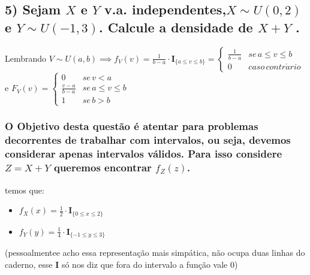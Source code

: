 \documentclass[portuguese]{article}
\begin{document}
\subsection*{\textmd{5) Sejam $X$ e $Y$ v.a. independentes,$X\sim U(0,2)$ e
$Y\sim U(-1,3)$. Calcule a densidade de $X+Y$ . }}

Lembrando $V\sim U(a,b)\implies f_{V}(v)=\frac{1}{b-a}\cdot\mathbf{I}_{\{a\leq v\leq b\}}=\begin{cases}
\frac{1}{b-a} & se\, a\leq v\leq b\\
0 & caso\, contr\acute{a}rio
\end{cases}$ e $F_{V}(v)=\begin{cases}
0 & se\, v<a\\
\frac{v-a}{b-a} & se\, a\leq v\leq b\\
1 & se\, b>b
\end{cases}$


\subsubsection*{\textmd{O Objetivo desta questão é atentar para problemas decorrentes
de trabalhar com intervalos, ou seja, devemos considerar apenas intervalos
válidos. Para isso considere $Z=X+Y$ queremos encontrar $f_{Z}(z)$. }}

temos que:
\begin{itemize}
\item $f_{X}(x)=\frac{1}{2}\cdot\mathbf{I}_{\{0\leq x\leq2\}}$
\item $f_{Y}(y)=\frac{1}{4}\cdot\mathbf{I}_{\{-1\leq y\leq3\}}$
\end{itemize}
(pessoalmentee acho essa representação mais simpática, não ocupa duas
linhas do caderno, esse \textbf{I} só nos diz que fora do intervalo
a função vale 0)
\end{document}

